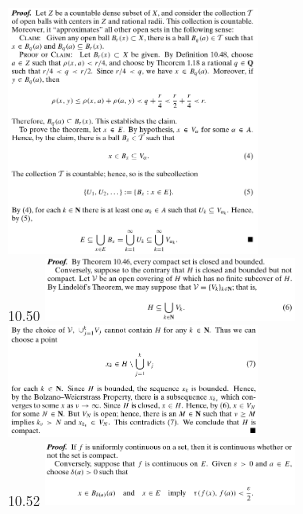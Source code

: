 \documentclass[8pt,landscape]{article}
\begin{document}
\begin{multicols}{3}
    \includegraphics[width=250]{10_49.png} \\
    10.50
    \includegraphics[width=250]{10_50a.png} \\
    \includegraphics[width=250]{10_50b.png} \\
    10.52
    \includegraphics[width=250]{10_52a.png} \\

\end{multicols}
\end{document}
